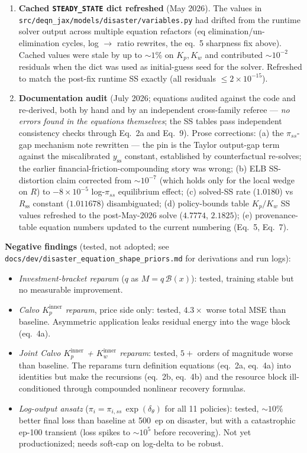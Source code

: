 \documentclass[11pt]{article}
\begin{document}
\begin{enumerate}
\item \textbf{Cached \texttt{STEADY\_STATE} dict refreshed} (May 2026).
  The values in \texttt{src/deqn\_jax/models/disaster/variables.py} had
  drifted from the runtime solver output across multiple equation
  refactors (eq elimination/un-elimination cycles, log $\to$ ratio
  rewrites, the eq.~5 sharpness fix above). Cached values were stale
  by up to $\sim\!1\%$ on $K_p, K_w$ and contributed ${\sim}10^{-2}$
  residuals when the dict was used as initial-guess seed for the
  solver. Refreshed to match the post-fix runtime SS exactly
  (all residuals $\leq 2\times 10^{-15}$).

\item \textbf{Documentation audit} (July 2026; equations audited against
  the code and re-derived, both by hand and by an independent
  cross-family referee --- \emph{no errors found in the equations
  themselves}; the SS tables pass independent consistency checks
  through Eq.~2a and Eq.~9). Prose corrections: (a) the
  $\pi_{ss}$-gap mechanism note rewritten --- the pin is the Taylor
  output-gap term against the miscalibrated $y_{\text{ss}}$ constant,
  established by counterfactual re-solves; the earlier
  financial-friction-compounding story was wrong; (b) ELB SS-distortion
  claim corrected from ${\sim}10^{-7}$ (which holds only for the local
  wedge on $R$) to $-8\times 10^{-5}$ log-$\pi_{ss}$ equilibrium effect;
  (c) solved-SS rate ($1.0180$) vs $R_{\text{ss}}$ constant
  ($1.011678$) disambiguated; (d) policy-bounds table $K_p/K_w$ SS
  values refreshed to the post-May-2026 solve ($4.7774$, $2.1825$);
  (e) provenance-table equation numbers updated to the current
  numbering (Eq.~5, Eq.~7).
\end{enumerate}

\bigskip\noindent\textbf{Negative findings} (tested, not adopted; see
\texttt{docs/dev/disaster\_equation\_shape\_priors.md} for derivations
and run logs):

\begin{itemize}
\item \emph{Investment-bracket reparam} ($q$ as $M = q\,\mathcal{B}(x)$):
  tested, training stable but no measurable improvement.
\item \emph{Calvo $K_p^{\text{inner}}$ reparam}, price side only: tested,
  $4.3\times$ worse total MSE than baseline. Asymmetric application leaks
  residual energy into the wage block (eq.~4a).
\item \emph{Joint Calvo $K_p^{\text{inner}}$ + $K_w^{\text{inner}}$
  reparam}: tested, $5+$ orders of magnitude worse than baseline. The
  reparams turn definition equations (eq.~2a, eq.~4a) into identities
  but make the recursions (eq.~2b, eq.~4b) and the resource block
  ill-conditioned through compounded nonlinear recovery formulas.
\item \emph{Log-output ansatz} ($\pi_i = \pi_{i,ss}\,\exp(\delta_\theta)$
  for all 11 policies): tested, $\sim\!10\%$ better final loss than
  baseline at 500~ep on disaster, but with a catastrophic ep-100
  transient (loss spikes to $\sim\!10^5$ before recovering). Not yet
  productionized; needs soft-cap on log-delta to be robust.
\end{itemize}
\end{document}
